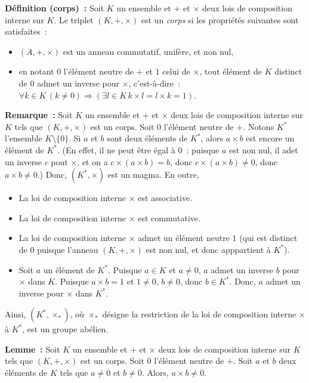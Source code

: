 \noindent\textbf{Définition (corps) :} Soit $K$ un ensemble et $+$ et $\times$ deux lois de composition interne sur $K$. 
    Le triplet $(K, +, \times)$ est un \textit{corps} si les propriétés suivantes sont satisfaites : 
    \begin{itemize}[nosep]
        \item $(A,+,\times)$ est un anneau commutatif, unifère, et non nul,
        \item en notant $0$ l'élément neutre de $+$ et $1$ celui de $\times$, tout élément de $K$ distinct de $0$ admet un inverse pour $\times$, c'est-à-dire : $\forall k \in K \, (k \neq 0) \Rightarrow (\exists l \in K \, k \times l = l \times k = 1)$.
    \end{itemize}

\medskip

\noindent\textbf{Remarque :} Soit $K$ un ensemble et $+$ et $\times$ deux lois de composition interne sur $K$ tels que $(K, +, \times)$ est un corps. 
    Soit $0$ l'élément neutre de $+$.
    Notons $K^*$ l'ensemble $K \setminus \lbrace 0 \rbrace$.
    Si $a$ et $b$ sont deux éléments de $K^*$, alors $a \times b$ est encore un élément de $K^*$. 
    (En effet, il ne peut être égal à $0$ : puisque $a$ est non nul, il adet un inverse $c$ pout $\times$, et on a $c \times (a \times b) = b$, donc $c \times (a \times b) \neq 0$, donc $a \times b \neq 0$.)
    Donc, $(K^*, \times)$ est un magma.
    En outre, 
    \begin{itemize}[nosep]
        \item La loi de composition interne $\times$ est associative.
        \item La loi de composition interne $\times$ est commutative.
        \item La loi de composition interne $\times$ admet un élément neutre $1$ (qui est distinct de $0$ puisque l'anneau $(K, +, \times)$ est non nul, et donc apppartient à $K^*$).
        \item Soit $a$ un élément de $K^*$. 
            Puisque $a \in K$ et $a \neq 0$, $a$ admet un inverse $b$ pour $\times$ dans $K$.
            Puisque $a \times b = 1$ et $1 \neq 0$, $b \neq 0$, donc $b \in K^*$.
            Donc, $a$ admet un inverse pour $\times$ dans $K^*$.
    \end{itemize}
    Ainsi, $(K^*, \times_*)$, où $\times_*$ désigne la restriction de la loi de composition interne $\times$ à $K^*$, est un groupe abélien.

\medskip

\noindent\textbf{Lemme :} Soit $K$ un ensemble et $+$ et $\times$ deux lois de composition interne sur $K$ tels que $(K, +, \times)$ est un corps. 
    Soit $0$ l'élément neutre de $+$.
    Soit $a$ et $b$ deux éléments de $K$ tels que $a \neq 0$ et $b \neq 0$.
    Alors, $a \times b \neq 0$.

